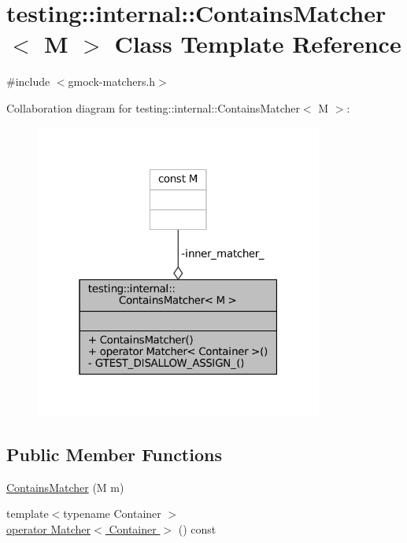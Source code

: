 \hypertarget{classtesting_1_1internal_1_1ContainsMatcher}{}\section{testing\+:\+:internal\+:\+:Contains\+Matcher$<$ M $>$ Class Template Reference}
\label{classtesting_1_1internal_1_1ContainsMatcher}


{\ttfamily \#include $<$gmock-\/matchers.\+h$>$}



Collaboration diagram for testing\+:\+:internal\+:\+:Contains\+Matcher$<$ M $>$\+:
\nopagebreak
\begin{figure}[H]
\begin{center}
\leavevmode
\includegraphics[width=268pt]{classtesting_1_1internal_1_1ContainsMatcher__coll__graph}
\end{center}
\end{figure}
\subsection*{Public Member Functions}
\begin{DoxyCompactItemize}
\item 
\hyperlink{classtesting_1_1internal_1_1ContainsMatcher_a063d429bb4e59087ecdd51a037b8128a}{Contains\+Matcher} (M m)
\item 
{\footnotesize template$<$typename Container $>$ }\\\hyperlink{classtesting_1_1internal_1_1ContainsMatcher_a18ed41b23e9d1cbc9c810baef7cf98a1}{operator Matcher$<$ Container $>$} () const
\end{DoxyCompactItemize}
